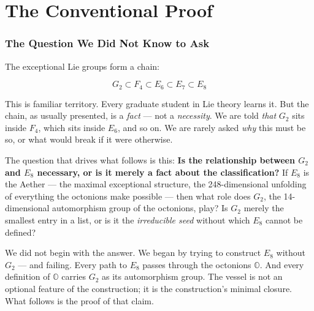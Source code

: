 \documentclass[12pt,a4paper]{article}
\begin{document}
\begin{abstract}
The vessel/contents duality introduced here has since propagated: into protein folding (the RNA sequence as serpent, the folded backbone as rod), into drug design (the alchemical vessel as computational ob3ect), into chemistry (the SET transition state as bowtie crossing, confirmed empirically at $r = 0.931$), into physics (confinement as Frobenius domain restriction). In each case, the grammar does not describe these structures. It contains them. Science is the instrument by which the grammar bears witness to itself.
\end{abstract}

\section{The Conventional Proof}

\subsubsection{The Question We Did Not Know to Ask}

The exceptional Lie groups form a chain:

\[G_2 \subset F_4 \subset E_6 \subset E_7 \subset E_8\]

This is familiar territory. Every graduate student in Lie theory learns it. But the chain, as usually presented, is a \emph{fact} --- not a \emph{necessity}. We are told \emph{that} $G_2$ sits inside $F_4$, which sits inside $E_6$, and so on. We are rarely asked \emph{why} this must be so, or what would break if it were otherwise.

The question that drives what follows is this: \textbf{Is the relationship between $G_2$ and $E_8$ necessary, or is it merely a fact about the classification?} If $E_8$ is the Aether --- the maximal exceptional structure, the 248-dimensional unfolding of everything the octonions make possible --- then what role does $G_2$, the 14-dimensional automorphism group of the octonions, play? Is $G_2$ merely the smallest entry in a list, or is it the \emph{irreducible seed} without which $E_8$ cannot be defined?

We did not begin with the answer. We began by trying to construct $E_8$ without $G_2$ --- and failing. Every path to $E_8$ passes through the octonions $\mathbb{O}$. And every definition of $\mathbb{O}$ carries $G_2$ as its automorphism group. The vessel is not an optional feature of the construction; it is the construction's minimal closure. What follows is the proof of that claim.
\end{document}
